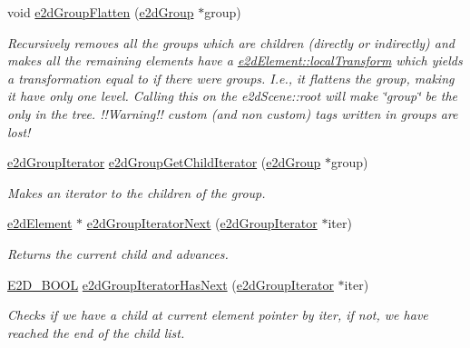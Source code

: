 \begin{DoxyCompactItemize}
void \hyperlink{group__e2dGroup_gafa65ab615b8a0c181a2d5b88eed9fa16}{e2d\-Group\-Flatten} (\hyperlink{structe2dGroup}{e2d\-Group} $\ast$group)
\begin{DoxyCompactList}\small\item\em Recursively removes all the groups which are children (directly or indirectly) and makes all the remaining elements have a \hyperlink{structe2dElement_a52bda732df714953f93c1e6f5f7c7c93}{e2d\-Element\-::local\-Transform} which yields a transformation equal to if there were groups. I.\-e., it flattens the group, making it have only one level. Calling this on the e2d\-Scene\-::root will make \char`\"{}group\char`\"{} be the only in the tree. !!\-Warning!! custom (and non custom) tags written in groups are lost! \end{DoxyCompactList}\item 
\hyperlink{structe2dGroupIterator}{e2d\-Group\-Iterator} \hyperlink{group__e2dGroup_gaf5a7338c446192338b764a7ac89371d5}{e2d\-Group\-Get\-Child\-Iterator} (\hyperlink{structe2dGroup}{e2d\-Group} $\ast$group)
\begin{DoxyCompactList}\small\item\em Makes an iterator to the children of the group. \end{DoxyCompactList}\item 
\hyperlink{structe2dElement}{e2d\-Element} $\ast$ \hyperlink{group__e2dGroup_gaa5ffe3eb2b83f318df4f22272f1e1189}{e2d\-Group\-Iterator\-Next} (\hyperlink{structe2dGroupIterator}{e2d\-Group\-Iterator} $\ast$iter)
\begin{DoxyCompactList}\small\item\em Returns the current child and advances. \end{DoxyCompactList}\item 
\hyperlink{Ez2DS_8h_aac8cdc3a3bcd6b56a8c3e0bb6979cbf8}{E2\-D\-\_\-\-B\-O\-O\-L} \hyperlink{group__e2dGroup_ga493d54c28198410762cfa32c97d8e646}{e2d\-Group\-Iterator\-Has\-Next} (\hyperlink{structe2dGroupIterator}{e2d\-Group\-Iterator} $\ast$iter)
\begin{DoxyCompactList}\small\item\em Checks if we have a child at current element pointer by iter, if not, we have reached the end of the child list. \end{DoxyCompactList}\end{DoxyCompactItemize}


